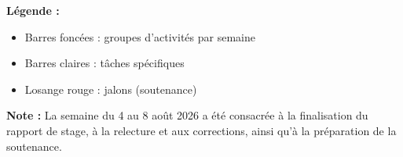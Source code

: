 \vspace{1em}

\noindent\textbf{L\'{e}gende :}
\begin{itemize}[nosep, leftmargin=1.5em]
    \item Barres fonc\'{e}es : groupes d'activit\'{e}s par semaine
    \item Barres claires : t\^{a}ches sp\'{e}cifiques
    \item Losange rouge : jalons (soutenance)
\end{itemize}

\vspace{0.5em}

\noindent\textbf{Note :} La semaine du 4 au 8 ao\^{u}t 2026 a \'{e}t\'{e} consacr\'{e}e \`{a} la finalisation du rapport de stage, \`{a} la relecture et aux corrections, ainsi qu'\`{a} la pr\'{e}paration de la soutenance.
